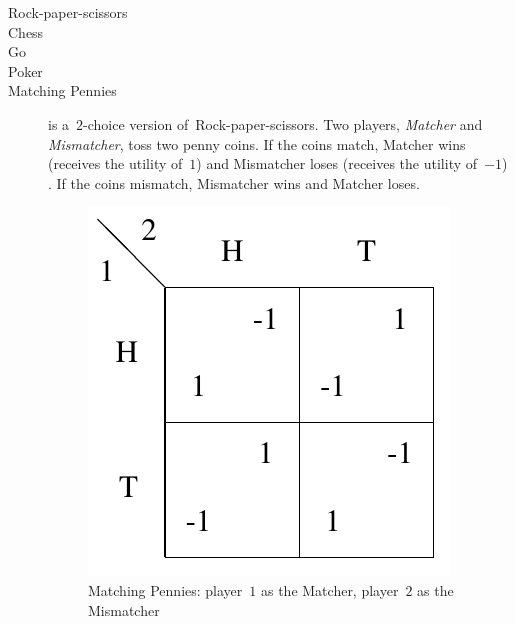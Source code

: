 \newcommand{\figurewidthratio}{0.3}
\begin{description}
  \item [Rock-paper-scissors]
  \item [Chess]
  \item [Go]
  \item [Poker]

  \item [Matching Pennies] is a~$2$-choice version of~Rock-paper-scissors.
    Two players, \emph{Matcher} and \emph{Mismatcher}, toss two penny coins.
    If the coins match, Matcher wins (receives the utility of~$1$) and Mismatcher loses (receives the utility of~$-1$) .
    If the coins mismatch, Mismatcher wins and Matcher loses.
    \begin{figure}[H]
      \centering
      \includegraphics[width=.3\textwidth]{../img/matching-pennies.png}
      \caption[Matching Pennies]{Matching Pennies: player~$1$ as the Matcher, player~$2$ as the Mismatcher}
      \label{fig:matching-pennies}
    \end{figure}

\end{description}


